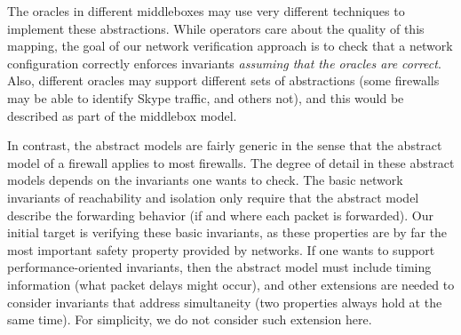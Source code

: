 The oracles in different middleboxes may use very different techniques to implement these abstractions. While operators care about the quality of this mapping, the goal of our network verification approach is to check that a network configuration correctly enforces invariants {\em assuming that the oracles are correct}. Also, different oracles may  support different sets of abstractions (\eg some firewalls may be able to identify Skype traffic, and others not), and this would be described as part of the middlebox model.


In contrast, the abstract models are fairly generic in the sense that the abstract model of a firewall applies to most firewalls. The degree of detail in these abstract models depends on the invariants one wants to check.  The basic network invariants of reachability and isolation only require that the abstract model describe the forwarding behavior (\eg if and where each packet is forwarded). Our initial target is verifying these basic invariants, as these properties are by far the most important safety property provided by networks. If one wants to support performance-oriented invariants, then the abstract model must include timing information (\eg what packet delays might occur), and other extensions are needed to consider invariants that address simultaneity (two properties always hold at the same time). For simplicity, we do not consider such extension here.


